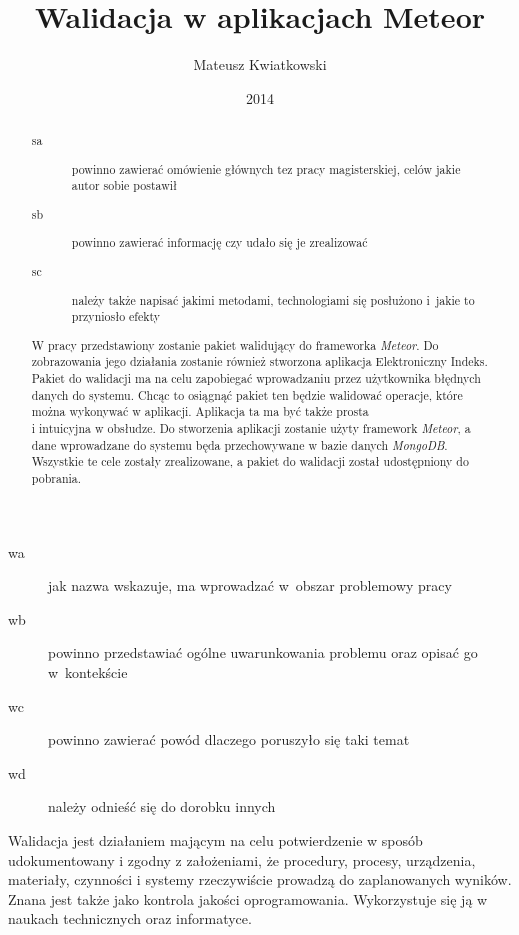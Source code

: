 \documentclass[brudnopis]{xmgr}
\author   {Mateusz Kwiatkowski}
\title    {Walidacja w aplikacjach Meteor}
\date     {2014}
\begin{document}
\begin{abstract}

\begin{description}
\item[sa] \textcolor{sa}{powinno zawierać omówienie głównych 
tez pracy magisterskiej, celów jakie autor sobie postawił} 
\item[sb] \textcolor{sb}{powinno zawierać informację czy udało 
  się je zrealizować}
\item[sc] \textcolor{sc}{należy także napisać jakimi metodami,
  technologiami się posłużono i~jakie to przyniosło efekty}
\end{description}

\textcolor{sa}{W pracy przedstawiony zostanie pakiet walidujący do frameworka \textit{Meteor}. Do zobrazowania
jego działania zostanie również stworzona aplikacja Elektroniczny Indeks. Pakiet do walidacji ma na celu zapobiegać
wprowadzaniu przez użytkownika błędnych danych do systemu. Chcąc to osiągnąć pakiet ten będzie
walidować operacje, które można wykonywać w aplikacji. Aplikacja ta ma być także prosta
\\
i intuicyjna w obsłudze.} \textcolor{sc}{Do stworzenia aplikacji zostanie użyty framework \textit{Meteor}, a dane wprowadzane do systemu
będa przechowywane w bazie danych \textit{MongoDB}.} \textcolor{sb}{Wszystkie te cele zostały zrealizowane,
a pakiet do walidacji został udostępniony do pobrania.}

\end{abstract}

\maketitle
%
\introduction

\begin{description}
\item[wa] \textcolor{wa}{jak nazwa wskazuje, ma wprowadzać 
  w~obszar problemowy pracy}
\item[wb] \textcolor{wb}{powinno przedstawiać ogólne 
  uwarunkowania problemu oraz opisać go w~kontekście}
\item[wc] \textcolor{wc}{powinno zawierać powód dlaczego 
  poruszyło się taki temat}
\item[wd] \textcolor{wd}{należy odnieść się do dorobku innych}
\end{description}

\textcolor{wa}{Walidacja jest działaniem mającym na celu potwierdzenie w sposób udokumentowany i zgodny
z założeniami, że procedury, procesy, urządzenia, materiały, czynności i systemy rzeczywiście
prowadzą do zaplanowanych wyników. Znana jest także jako kontrola jakości oprogramowania.
Wykorzystuje się ją w naukach technicznych oraz informatyce.}
\\
\end{document}
